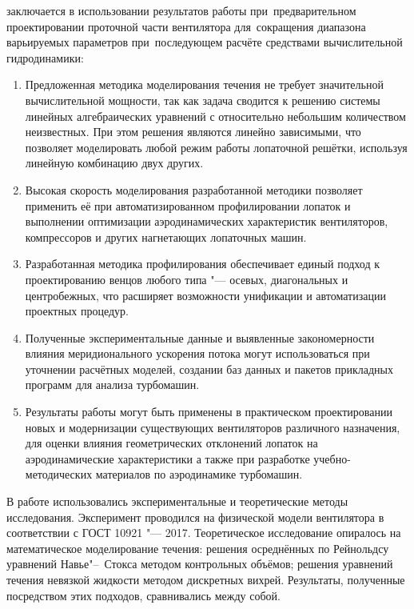 {\influence}
заключается в использовании результатов работы при~предварительном проектировании проточной части вентилятора для~сокращения диапазона варьируемых параметров при~последующем расчёте средствами вычислительной гидродинамики:
\begin{enumerate}[]
	\item Предложенная методика моделирования течения не требует значительной вычислительной мощности, так как задача сводится к решению системы линейных алгебраических уравнений с относительно небольшим количеством неизвестных.
	При этом решения являются линейно зависимыми, что позволяет моделировать любой режим работы лопаточной решётки, используя линейную комбинацию двух других.

	\item Высокая скорость моделирования разработанной методики позволяет применить её при автоматизированном профилировании лопаток и выполнении оптимизации аэродинамических характеристик вентиляторов, компрессоров и других нагнетающих лопаточных машин.

	\item Разработанная методика профилирования обеспечивает единый подход к проектированию венцов любого типа "--- осевых, диагональных и центробежных, что расширяет возможности унификации и автоматизации проектных процедур.

	\item Полученные экспериментальные данные и выявленные закономерности влияния меридионального ускорения потока могут использоваться при уточнении расчётных моделей, создании баз данных и пакетов прикладных программ для анализа турбомашин.

	\item Результаты работы могут быть применены в практическом проектировании новых и модернизации существующих вентиляторов различного назначения, для оценки влияния геометрических отклонений лопаток на аэродинамические характеристики а также при разработке учебно-методических материалов по аэродинамике турбомашин.
\end{enumerate}

{\methods} В работе использовались экспериментальные и теоретические методы исследования.
Эксперимент проводился на физической модели вентилятора в соответствии с ГОСТ 10921 "--- 2017.
Теоретическое исследование опиралось на математическое моделирование течения: решения осреднённых по Рейнольдсу уравнений Навье"--~Стокса методом контрольных объёмов; решения уравнений течения невязкой жидкости методом дискретных вихрей.
Результаты, полученные посредством этих подходов, сравнивались между собой.

